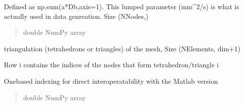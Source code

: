 \documentclass[letterpaper,10pt,english]{sphinxmanual}
\begin{document}
\begin{fulllineitems}
\begin{fulllineitems}
\begin{quote}
\begin{description}
\end{description}\end{quote}

\end{fulllineitems}


\begin{fulllineitems}
\label{\detokenize{_autosummary/nirfasterff.base.dcs_mesh.dcsmesh:nirfasterff.base.dcs_mesh.dcsmesh.aDb}}
\pysigstartsignatures
{}
\pysigstopsignatures
\sphinxAtStartPar
Defined as np.sum(a*Db,axis=1). This lumped parameter (mm\textasciicircum{}2/s) is what is actually used in data genreation. Size (NNodes,)
\begin{quote}\begin{description}
\sphinxAtStartPar
double NumPy array

\end{description}\end{quote}

\end{fulllineitems}


\begin{fulllineitems}
\label{\detokenize{_autosummary/nirfasterff.base.dcs_mesh.dcsmesh:nirfasterff.base.dcs_mesh.dcsmesh.elements}}
\pysigstartsignatures
{}
\pysigstopsignatures
\sphinxAtStartPar
triangulation (tetrahedrons or triangles) of the mesh, Size (NElements, dim+1)

\sphinxAtStartPar
Row i contains the indices of the nodes that form tetrahedron/triangle i

\sphinxAtStartPar
One\sphinxhyphen{}based indexing for direct interoperatability with the Matlab version
\begin{quote}\begin{description}
\sphinxAtStartPar
double NumPy array

\end{description}\end{quote}

\end{fulllineitems}


\end{fulllineitems}
\end{document}
